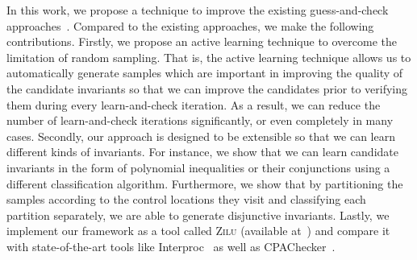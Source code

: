 In this work, we propose a technique to improve the existing guess-and-check approaches~\cite{sharma2012interpolants,sharma2013verification,DBLP:conf/esop/0001GHALN13,sharma2014invariant}.
Compared to the existing approaches, we make the following contributions.
Firstly, we propose an active learning technique to overcome the limitation of random sampling.
That is, the active learning technique allows us to automatically generate samples which are important in improving the quality of the candidate invariants
so that we can improve the candidates prior to verifying them during every learn-and-check iteration.
As a result, we can reduce the number of learn-and-check iterations significantly, or even completely in many cases.
Secondly, our approach is designed to be extensible so that we can learn different kinds of invariants.
For instance, we show that we can learn candidate invariants in the form of polynomial inequalities or their conjunctions using a different classification algorithm.
Furthermore, we show that by partitioning the samples according to the control locations they visit and classifying each partition separately, we are able to generate disjunctive invariants. Lastly, we implement our framework as a tool called \textsc{Zilu} (available at~\cite{zilu:repo}) and compare it with state-of-the-art tools like Interproc~\cite{jeannet2010interproc} as well as CPAChecker~\cite{DBLP:conf/cav/BeyerK11}.
